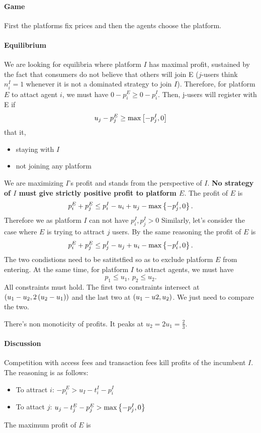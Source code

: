 \paragraph{Game} First the platforms fix prices and then the agents choose the platform. 
\paragraph{Equilibrium} We are looking for equilibria where platform $I$ has maximal profit, sustained by the fact that consumers do not believe that others will join E ($j$-users think $n_i^I=1$ whenever it is not a dominated strategy to join $I$).
Therefore, for platform $E$ to attact agent $i$, we must have $0-p_i^E\ge 0-p_i^I$. 
Then, j-users will
register with E if $$u_j-p_j^E \ge \max\left[-p_j^I,0\right] $$ that it, \begin{itemize}
    \item staying with $I$
    \item not joining any platform
\end{itemize}
We are maximizing $I$'s profit and stands from the perspective of $I$. \textbf{No strategy of $I$ must give strictly positive profit to platform $E$}. The profit of $E$ is $$p_i^E+p_j^E\le p_i^I-u_i+u_j-\max\left\{-p_j^I,0\right\}.$$ Therefore we as platform $I$ can not have $p_i^I,p_j^I>0$
Similarly, let's consider the case where $E$ is trying to attract $j$ users. By the same reasoning the profit of $E$ is $$p_i^E+p_j^E\le p_j^I-u_j+u_i-\max\left\{-p_i^I,0\right\}.$$ The two condistions need to be satitstfied so as to exclude platform $E$ from entering.
At the same time, for platform $I$ to attract agents, we must have $$p_1\le u_1,\ p_2\le u_2.$$
All constraints must hold.
The first two constraints intersect at $\left(u_1-u_2,2\left(u_2-u_1\right)\right)$ and the last two at $\left(u_1-u2,u_2\right)$. We just need to compare the two.
\begin{remark}
    There's non monoticity of profits. It peaks at $u_2=2u_1=\frac{2}{3}$. 
\end{remark}
\paragraph{Discussion} Competition with access fees and transaction fees kill profits of the incumbent $I$. 
The reasoning is as follows:\begin{itemize}
    \item To attract $i$: $-p_i^E>u_I-t_i^I-p_i^I$
    \item To attact $j$: $u_j-t_j^E-p_j^E>\max\left\{-p_j^I,0\right\}$
\end{itemize}
The maximum profit of $E$ is 